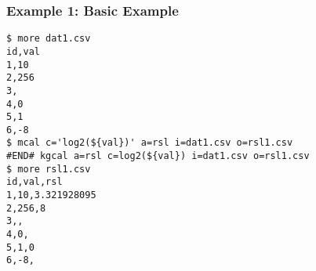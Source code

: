 \subsubsection*{Example 1: Basic Example}



\begin{Verbatim}[baselinestretch=0.7,frame=single]
$ more dat1.csv
id,val
1,10
2,256
3,
4,0
5,1
6,-8
$ mcal c='log2(${val})' a=rsl i=dat1.csv o=rsl1.csv
#END# kgcal a=rsl c=log2(${val}) i=dat1.csv o=rsl1.csv
$ more rsl1.csv
id,val,rsl
1,10,3.321928095
2,256,8
3,,
4,0,
5,1,0
6,-8,
\end{Verbatim}
